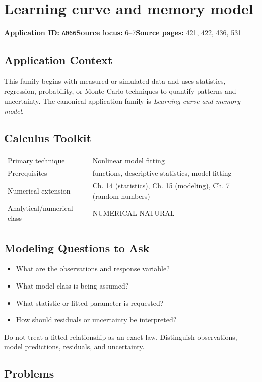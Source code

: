 \documentclass[11pt]{book}
\newcommand{\pid}[1]{\texttt{#1}}
\begin{document}
\chapter{Learning curve and memory model}\label{app:A066}
\textbf{Application ID:} \pid{A066}\quad \textbf{Source locus:} 6–7\quad \textbf{Source pages:} 421, 422, 436, 531
\section*{Application Context}
This family begins with measured or simulated data and uses statistics, regression, probability, or Monte Carlo techniques to quantify patterns and uncertainty. The canonical application family is \emph{Learning curve and memory model}.
\section*{Calculus Toolkit}
\begin{tabularx}{\textwidth}{@{}lX@{}}\toprule
Primary technique & Nonlinear model fitting \\
Prerequisites & functions, descriptive statistics, model fitting \\
Numerical extension & Ch. 14 (statistics), Ch. 15 (modeling), Ch. 7 (random numbers) \\
Analytical/numerical class & NUMERICAL-NATURAL \\
\bottomrule\end{tabularx}
\section*{Modeling Questions to Ask}\begin{itemize}
\item What are the observations and response variable?
\item What model class is being assumed?
\item What statistic or fitted parameter is requested?
\item How should residuals or uncertainty be interpreted?
\end{itemize}
\begin{errorbox}Do not treat a fitted relationship as an exact law. Distinguish observations, model predictions, residuals, and uncertainty.\end{errorbox}
\section*{Problems}
\end{document}
